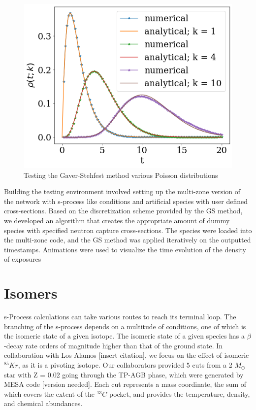 \documentclass{article}
\begin{document}
\begin{figure}[!htp]
    \centerline{\includegraphics[scale = 0.5]{images/poisson_test.png}}
    \caption{Testing the Gaver-Stehfest method various Poisson distributions}
\end{figure}


Building the testing environment involved setting up the multi-zone version of the network with s-process like conditions and artificial 
species with user defined cross-sections. Based on the discretization scheme provided by the GS method, we developed an algorithm 
that creates the appropriate amount of dummy species with specified neutron capture cross-sections. The species were loaded into the 
multi-zone code, and the GS method was applied iteratively on the outputted timestamps. Animations were used to visualize the time 
evolution of the density of exposures 

\section*{Isomers}

s-Process calculations can take various routes to reach its terminal loop. The branching of the s-process depends on a multitude of 
conditions, one of which is the isomeric state of a given isotope. The isomeric state of a given species has a $\beta$-decay rate 
orders of magnitude higher than that of the ground state. In collaboration with Los Alamos [insert citation], we focus on the 
effect of isomeric $^{85}Kr$, as it is a pivoting isotope.  Our collaborators provided 5 cuts from a 2 
$M_{\odot}$ star with Z = 0.02 going through the TP-AGB phase, which were generated by MESA code [version needed]\cite{paxton2010modules,paxton2013modules,paxton2015modules,paxton2018modules,paxton2019modules}.
Each cut represents a mass coordinate, the sum of which covers the extent of the $^{13}C$ pocket, and provides the temperature, density, and 
chemical abundances. 
\end{document}
